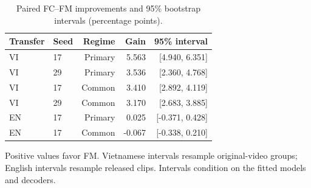 \begin{table}[tbp]
\centering\small
\caption{Paired FC--FM improvements and 95\% bootstrap intervals (percentage points).}
\label{tab:comparisons}
\begin{tabular}{llrrr}
\toprule
Transfer & Seed & Regime & Gain & 95\% interval \\
\midrule
VI & 17 & Primary & 5.563 & [4.940, 6.351] \\
VI & 29 & Primary & 3.536 & [2.360, 4.768] \\
VI & 17 & Common & 3.410 & [2.892, 4.119] \\
VI & 29 & Common & 3.170 & [2.683, 3.885] \\
EN & 17 & Primary & 0.025 & [-0.371, 0.428] \\
EN & 17 & Common & -0.067 & [-0.338, 0.210] \\
\bottomrule
\end{tabular}
\par\smallskip\begin{minipage}{\linewidth}\footnotesize Positive values favor FM. Vietnamese intervals resample original-video groups; English intervals resample released clips. Intervals condition on the fitted models and decoders.
\end{minipage}
\end{table}
